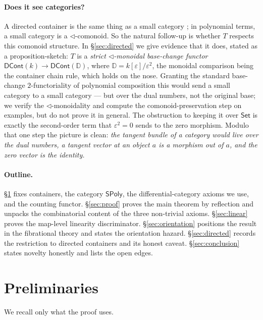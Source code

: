 \documentclass[11pt]{article}
\theoremstyle{definition}
\newcommand{\SPoly}{\mathsf{SPoly}}
\newcommand{\DCont}{\mathsf{DCont}}
\newcommand{\Set}{\mathsf{Set}}
\newcommand{\DD}{\mathbb{D}}
\begin{document}
\paragraph{Does it see categories?}
A directed container is the same thing as a small category \cite{AhmanUustalu2016}; in polynomial
terms, a small category is a $\lhd$-comonoid. So the natural follow-up is whether $T$ respects this
comonoid structure. In \S\ref{sec:directed} we give evidence that it does, stated as a
proposition-sketch: $T$ is a \emph{strict $\lhd$-monoidal base-change functor}
$\DCont(k)\to\DCont(\DD)$, where $\DD=k[\varepsilon]/\varepsilon^2$, the monoidal comparison being the
container chain rule, which holds on the nose. Granting the standard base-change $2$-functoriality of
polynomial composition this would send a small category to a small category --- but over the dual
numbers, not the original base; we verify the $\lhd$-monoidality and compute the
comonoid-preservation step on examples, but do not prove it in general. The obstruction to keeping it
over $\Set$ is exactly the second-order term that $\varepsilon^2=0$ sends to the zero morphism.
Modulo that one step the picture is clean: \emph{the tangent bundle of a category would live over the
dual numbers, a tangent vector at an object $a$ is a morphism out of $a$, and the zero vector is the
identity.}

\paragraph{Outline.}
\S\ref{sec:prelim} fixes containers, the category $\SPoly$, the differential-category axioms we
use, and the counting functor. \S\ref{sec:proof} proves the main theorem by reflection and
unpacks the combinatorial content of the three non-trivial axioms. \S\ref{sec:linear} proves the
map-level linearity discriminator. \S\ref{sec:orientation} positions the result in the fibrational
theory and states the orientation hazard. \S\ref{sec:directed} records the restriction to directed
containers and its honest caveat. \S\ref{sec:conclusion} states novelty honestly and lists the open
edges.

\section{Preliminaries}\label{sec:prelim}

We recall only what the proof uses.
\end{document}
